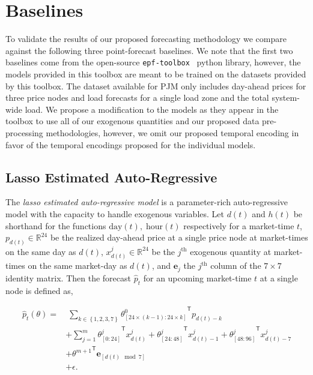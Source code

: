 \section{Baselines}\label{sec:baselines}

To validate the results of our proposed forecasting methodology we compare against the following three point-forecast
baselines.
We note that the first two baselines come from the open-source \texttt{epf-toolbox}~\cite{epftoolbox} python library,
however, the models provided in this toolbox are meant to be trained on the datasets provided by this toolbox.
The dataset available for PJM only includes day-ahead prices for three price nodes and load forecasts for a single
load zone and the total system-wide load.
We propose a modification to the models as they appear in the toolbox to use all of our exogenous quantities and our
proposed data pre-processing methodologies, however, we omit our proposed temporal encoding in favor of the temporal
encodings proposed for the individual models.

\subsection{Lasso Estimated Auto-Regressive}\label{subsec:lasso-estimated-auto-regressive}

The \textit{lasso estimated auto-regressive model} is a parameter-rich auto-regressive model with the capacity to handle
exogenous variables.
Let $d(t)$ and $h(t)$ be shorthand for the functions $\text{day}(t),\; \text{hour}(t)$ respectively for a market-time
$t$, $p_{d(t)} \in \mathbb{R}^{24}$ be the realized day-ahead price at a single price node at market-times on the same
day as $d(t)$, $x^j_{d(t)} \in \mathbb{R}^{24}$ be the $j^{\text{th}}$ exogenous quantity at market-times on the same market-day
as $d(t)$, and $\textbf{e}_{j}$ the $j^{\text{th}}$ column of the $7\times7$ identity matrix.
Then the forecast $\hat{p}_t$ for an upcoming market-time $t$ at a single node is defined as,

\begin{align*}
    \hat{p}_t(\theta) = & \; \sum_{k \in \left\{ 1, 2, 3, 7 \right\}} {\theta^0_{\left[ 24 \times (k-1) : 24 \times k \right]}}^\mathsf{T} p_{d(t) - k} \\
                        & +  \sum_{j=1}^m {\theta^j_{\left[0:24\right]}}^\mathsf{T} x^j_{d(t)} + {\theta^j_{\left[24:48\right]}}^\mathsf{T} x^j_{d(t) - 1} + {\theta^j_{\left[48:96\right]}}^\mathsf{T} x^j_{d(t) - 7} \\
                        & +  {\theta^{m + 1}}^\mathsf{T} \textbf{e}_{\left[d(t) \mod 7\right]} \\
                        & +  \epsilon.
\end{align*}


